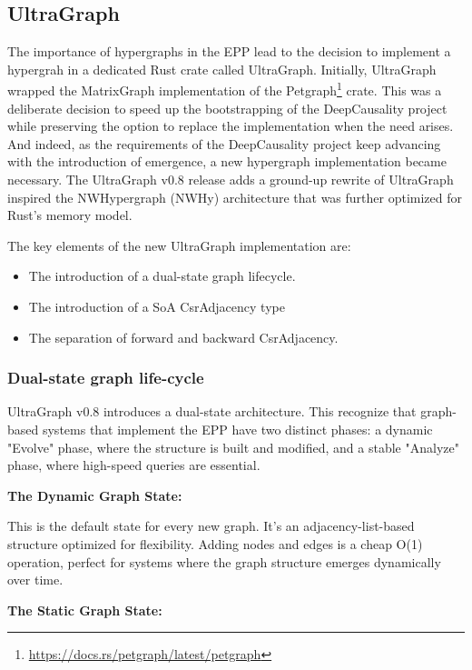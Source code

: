 
\subsection{UltraGraph}
\label{sec:implementation_ultragraph}

The importance of hypergraphs in the EPP lead to the decision to implement a hypergrah in a dedicated Rust crate called UltraGraph. Initially, UltraGraph wrapped the MatrixGraph implementation of the 
Petgraph\footnote{\url{https://docs.rs/petgraph/latest/petgraph}} crate. This was a deliberate decision
to speed up the bootstrapping of the DeepCausality project while preserving the option to 
replace the implementation when the need arises. And indeed, as the requirements  of the
DeepCausality project keep advancing with the introduction of emergence, a new hypergraph implementation became necessary. The UltraGraph v0.8 release adds a ground-up rewrite of  UltraGraph inspired the NWHypergraph (NWHy)\cite{liu2022nwhy} architecture that was further optimized for Rust's memory model. 
  
The key elements of the new UltraGraph implementation are:
  
\begin{itemize}
	\item The introduction of a dual-state graph lifecycle.
	\item The introduction of a SoA CsrAdjacency type
	\item The separation of forward and backward CsrAdjacency.
\end{itemize}

\subsubsection{Dual-state graph life-cycle}


UltraGraph v0.8 introduces a dual-state architecture. This recognize that graph-based systems that implement the EPP have two distinct phases: a dynamic "Evolve" phase, where the structure is built and modified, and a stable "Analyze" phase, where high-speed queries are essential. 

\textbf{The Dynamic Graph State:} 

This is the default state for every new graph. It's an adjacency-list-based structure
optimized for flexibility. Adding nodes and edges is a cheap O(1) operation, perfect for systems where the graph structure emerges dynamically over time.

\textbf{The Static Graph State:}


